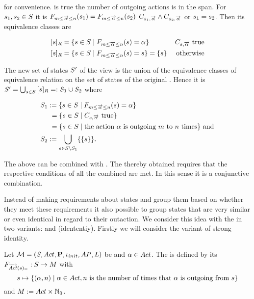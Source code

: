 \documentclass[preview]{standalone}
\begin{document}
for convenience. \formoutact is true  \iffN the number of outgoing actions is in the span. For ${s}_1, {s}_2 \in {S}$ it is ${{F_{{m}\leq{\overrightarrow{\ensuremath{{\alpha}}}}\leq{n}}}}({s}_1) = {{F_{{m}\leq{\overrightarrow{\ensuremath{{\alpha}}}}\leq{n}}}}({s}_2)$ \iffN $\formoutact[\state_1] \land \formoutact[\state_2]$ or ${s}_1 = {s}_2$. Then its equivalence classes are

\begin{align*}
	{\ensuremath{{[{s}]_{{R}}}}} &= \{{s} \in {S} \mid {\ensuremath{{F_{{m}\leq{\overrightarrow{\ensuremath{{\alpha}}}}\leq{n}}}}}({s}) = {\alpha}\} &{C_{{s},{\overrightarrow{{\alpha}}}}} \text{ true} \\
	{{[{s}]_{{R}}}} &= \{{s} \in {S} \mid {\ensuremath{{F_{{m}\leq{\overrightarrow{\ensuremath{{\alpha}}}}\leq{n}}}}}({s}) = {s}\} = \{{s}\} &\text{ otherwise}	
\end{align*}

The new set of states ${S}'$ of the view \viewspanoutaction is the union of the equivalence classes of equivalence relation \eqrelview on the set of states \states of the original \chosengraphtypeN. Hence it is ${S}' = \bigcup_{{s} \in {S}} {{[{s}]_{{R}}}} =: {S}_1 \cup {S}_2$ where

\begin{align*}
	{S}_1 &:= \{{s} \in {S} \mid {\ensuremath{{F_{{m}\leq{\overrightarrow{\ensuremath{{\alpha}}}}\leq{n}}}}}({s}) = {\alpha}\} \\
	&\hspace{1.15mm}= \{{s} \in {S}  \mid {C_{\ensuremath{{s}},\ensuremath{{\overrightarrow{{\alpha}}}}}} \text{ true}\} \\
	&\hspace{1.15mm}= \{{s} \in {S} \mid \text{the action } {\alpha} \text{ is outgoing } {m} \text{ to } {n} \text{ times}\} \text{ and} \\
	{S}_2 &:= {\bigcup_{{s} \in {S} \setminus {S}_1}\{\{{s}\}\}}.
\end{align*}

The \viewsN above can be combined with \parllcompN. The thereby obtained \viewN requires that the respective conditions of all the combined \viewsN are met. In this sense it is a conjunctive combination.

Instead of making requirements about states and group them based on whether they meet these requirements it also possible to group states that are very similar or even identical in regard to their outaction. We consider this idea with the \emph{\outactident \viewNC} in two variants: \outactidentstrong and \outactidentweak (idententiy). Firstly we will consider the variant of strong identity.

\begin{definition}
	Let ${{{\mathcal{M}}}} = {{({S}, {Act}, {\textbf{P}}, {\iota_{init}}, {AP}, {L})}}$ be \chosengraphtypeN and ${\alpha} \in {Act}$. The \viewN \viewstrongoutactident is defined by its \grpfctN ${{F_{{\overrightarrow{{Act}}}({s})_=}}} : {S} \to {\ensuremath{{M}}}$ with
	\[
	\state \mapsto	
	\{(\action, \numoutact) \mid \action \in \actions, \numoutact \text{ is the number of times that \action is outgoing from } \state\}
	\]
	and ${{M}} := {Act} \times {\mathbb{N}}_0$.
\end{definition}
\end{document}
